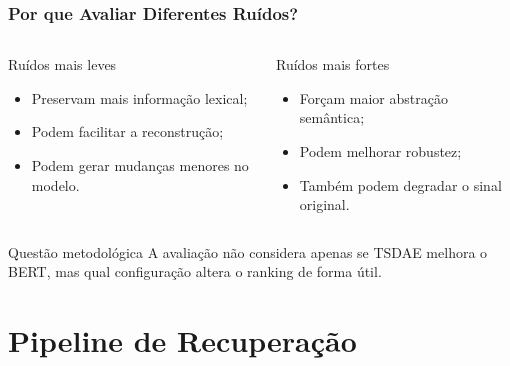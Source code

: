 \documentclass[aspectratio=169]{beamer}
\begin{document}
\begin{frame}
\frametitle{Por que Avaliar Diferentes Ruídos?}

\begin{columns}

\begin{block}{Ruídos mais leves}
\begin{itemize}
  \item Preservam mais informação lexical;
  \item Podem facilitar a reconstrução;
  \item Podem gerar mudanças menores no modelo.
\end{itemize}
\end{block}

\begin{block}{Ruídos mais fortes}
\begin{itemize}
  \item Forçam maior abstração semântica;
  \item Podem melhorar robustez;
  \item Também podem degradar o sinal original.
\end{itemize}
\end{block}

\end{columns}

\vspace{0.3cm}

\begin{alertblock}{Questão metodológica}
A avaliação não considera apenas se TSDAE melhora o BERT, mas qual configuração altera o ranking de forma útil.
\end{alertblock}

\end{frame}

\section{Pipeline de Recuperação}
\end{document}
